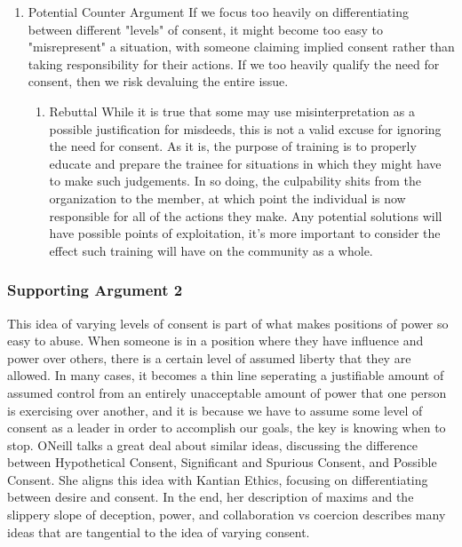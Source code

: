 \documentclass[11pt]{article}
\begin{document}
\begin{enumerate}
\item Potential Counter Argument
\label{sec:org3473e21}
If we focus too heavily on differentiating between different "levels" of consent, it might become too easy to "misrepresent" a situation, with someone claiming implied consent rather than taking responsibility for their actions. If we too heavily qualify the need for consent, then we risk devaluing the entire issue.

\begin{enumerate}
\item Rebuttal
\label{sec:orged761c4}
While it is true that some may use misinterpretation as a possible justification for misdeeds, this is not a valid excuse for ignoring the need for consent. As it is, the purpose of training is to properly educate and prepare the trainee for situations in which they might have to make such judgements. In so doing, the culpability shits from the organization to the member, at which point the individual is now responsible for all of the actions they make. Any potential solutions will have possible points of exploitation, it's more important to consider the effect such training will have on the community as a whole.
\end{enumerate}
\end{enumerate}

\subsubsection{Supporting Argument 2}
\label{sec:orged9d6f8}
This idea of varying levels of consent is part of what makes positions of power so easy to abuse. When someone is in a position where they have influence and power over others, there is a certain level of assumed liberty that they are allowed. In many cases, it becomes a thin line seperating a justifiable amount of assumed control from an entirely unacceptable amount of power that one person is exercising over another, and it is because we have to assume some level of consent as a leader in order to accomplish our goals, the key is knowing when to stop. ONeill talks a great deal about similar ideas, discussing the difference between Hypothetical Consent, Significant and Spurious Consent, and Possible Consent. She aligns this idea with Kantian Ethics, focusing on differentiating between desire and consent. In the end, her description of maxims and the slippery slope of deception, power, and collaboration vs coercion describes many ideas that are tangential to the idea of varying consent. 
\end{document}
